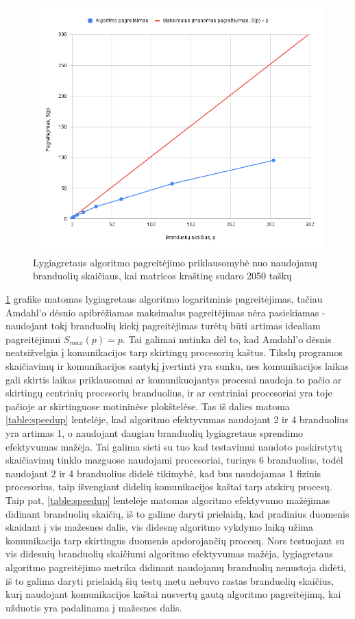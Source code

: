 \documentclass{VUMIFPSbakalaurinis}
\begin{document}
\begin{figure}[H]
    \centering
    \includegraphics[scale=0.5]{img/parallel_speedup.png}
    \caption{Lygiagretaus algoritmo pagreitėjimo priklausomybė nuo naudojamų branduolių skaičiaus, kai matricos kraštinę sudaro 2050 taškų}
    \label{img:parallel_speedup}
\end{figure}


\ref{img:parallel_speedup} grafike matomas lygiagretaus algoritmo logaritminis pagreitėjimas, tačiau Amdahl'o dėsnio \cite{amdahl1967validity} apibrėžiamas maksimalus pagreitėjimas nėra pasiekiamas - naudojant tokį branduolių kiekį pagreitėjimas turėtų būti artimas idealiam pagreitėjimui  $S_{max}(p)=p$.
Tai galimai nutinka dėl to, kad Amdahl'o dėsnis neatsižvelgia į komunikacijos tarp skirtingų procesorių kaštus.
Tikslų programos skaičiavimų ir komunikacijos santykį įvertinti yra sunku, nes komunikacijos laikas gali skirtis laikas priklausomai ar komunikuojantys procesai naudoja to pačio ar skirtingų centrinių procesorių branduolius, 
ir ar centriniai procesoriai yra toje pačioje ar skirtinguose motininėse plokštelėse. 
Tas iš dalies matoma \ref{table:speedup} lentelėje, kad algoritmo efektyvumas naudojant 2 ir 4 branduolius yra artimas 1, o naudojant daugiau branduolių lygiagretaus sprendimo efektyvumas mažėja.
Tai galima sieti su tuo kad testavimui naudoto paskirstytų skaičiavimų tinklo mazguose naudojami procesoriai, turinys 6 branduolius, todėl naudojant 2 ir 4 branduolius didelė tikimybė, kad bus naudojamas 1 fizinis procesorius, taip išvengiant didelių komunikacijos kaštai tarp atskirų procesų.
Taip pat, \ref{table:speedup} lentelėje matomas algoritmo efektyvumo mažėjimas didinant branduolių skaičių, iš to galime daryti prielaidą, kad pradinius duomenis skaidant į vis mažesnes dalis, vis didesnę algoritmo vykdymo laiką užima komunikacija tarp skirtingus duomenis apdorojančių procesų.
Nors testuojant su vis didesnių branduolių skaičiumi algoritmo efektyvumas mažėja, lygiagretaus algoritmo pagreitėjimo metrika didinant naudojamų branduolių nenustoja didėti, iš to galima daryti prielaidą šių testų metu nebuvo rastas branduolių skaičius, kurį naudojant komunikacijos kaštai nusvertų gautą algoritmo pagreitėjimą, kai užduotis yra padalinama į mažesnes dalis. 
\end{document}
